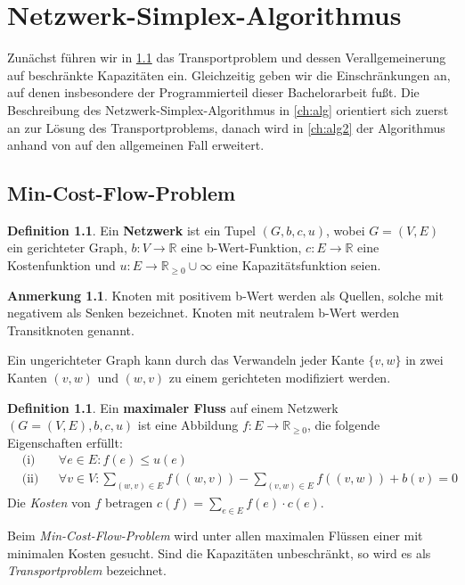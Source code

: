 \documentclass[a4paper,twoside,ngerman]{report}
\theoremstyle{plain}
\theoremstyle{definition}
\newtheorem{defn}[thm]{Definition}
\newtheorem*{anm}{Anmerkung}
\begin{document}
\chapter{Netzwerk-Simplex-Algorithmus}\label{ch:NSA}
Zunächst führen wir in \cref{ch:MCF} das Transportproblem und dessen Verallgemeinerung auf beschränkte Kapazitäten ein. Gleichzeitig geben wir die Einschränkungen an, auf denen insbesondere der Programmierteil dieser Bachelorarbeit fußt. Die Beschreibung des Netzwerk-Simplex-Algorithmus in \cref{ch:alg} orientiert sich zuerst an \cite[S. 291\,ff.]{NSAbook} zur Lösung des Transportproblems, danach wird in \cref{ch:alg2} der Algorithmus anhand von \cite[S. 353\,ff.]{NSAbook} auf den allgemeinen Fall erweitert.

\section{Min-Cost-Flow-Problem}\label{ch:MCF}
\begin{defn}Ein \textbf{Netzwerk} ist ein Tupel $(G,b,c,u)$, wobei $G = (V,E)$ ein gerichteter Graph, $b : V\rightarrow\mathbb{R}$ eine b-Wert-Funktion, $c : E\rightarrow\mathbb{R}$ eine Kostenfunktion und $u : E\rightarrow\mathbb{R}_{\geq 0}\cup \infty$ eine Kapazitätsfunktion seien.\end{defn}
\begin{anm}Knoten mit positivem b-Wert werden als Quellen, solche mit negativem als Senken bezeichnet. Knoten mit neutralem b-Wert werden Transitknoten genannt.

Ein ungerichteter Graph kann durch das Verwandeln jeder Kante $\{v,w\}$ in zwei Kanten $(v,w)$ und $(w,v)$ zu einem gerichteten modifiziert werden.\end{anm}

\begin{defn}\label{DefMaxFlow}Ein \textbf{maximaler Fluss} auf einem Netzwerk $(G=(V,E),b,c,u)$ ist eine Abbildung $f : E\rightarrow\mathbb{R}_{\geq 0}$, die folgende Eigenschaften erfüllt:
\begin{align}
&\text{(i)}&&\forall e\in E : f(e)\leq u(e)\nonumber\\
&\text{(ii)}&&\forall v\in V : \sum_{(w,v)\in E} f((w,v)) - \sum_{(v,w)\in E} f((v,w)) + b(v) = 0\label{DefMaxFlowII}
\end{align}
Die \emph{Kosten} von $f$ betragen $c(f) = \sum_{e\in E} f(e)\cdot c(e)$.
\end{defn}

Beim \emph{Min-Cost-Flow-Problem} wird unter allen maximalen Flüssen einer mit minimalen Kosten gesucht. Sind die Kapazitäten unbeschränkt, so wird es als \emph{Transportproblem} bezeichnet.
\end{document}
